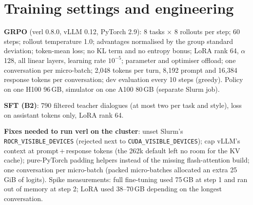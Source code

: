 \documentclass[12pt,a4paper]{article}
\begin{document}
\section{Training settings and engineering}
\label{app:eng}

\textbf{GRPO} (verl 0.8.0, vLLM 0.12, PyTorch 2.9): 8 tasks $\times$ 8
rollouts per step; 60 steps; rollout temperature 1.0; advantages normalised by
the group standard deviation; token-mean loss; no KL term and no entropy
bonus; LoRA rank 64, $\alpha$ 128, all linear layers, learning rate
$10^{-5}$; parameter and optimiser offload; one conversation per
micro-batch; 2,048 tokens per turn, 8,192 prompt and 16,384 response tokens
per conversation; dev evaluation every 10 steps (greedy). Policy on one H100
96\,GB, simulator on one A100 80\,GB (separate Slurm job).

\textbf{SFT (B2)}: 790 filtered teacher dialogues (at most two per task and
style), loss on assistant tokens only, LoRA rank 64.

\textbf{Fixes needed to run verl on the cluster}: unset Slurm's
\texttt{ROCR\_VISIBLE\_DEVICES} (rejected next to
\texttt{CUDA\_VISIBLE\_DEVICES}); cap vLLM's context at prompt\,+\,response
tokens (the 262k default left no room for the KV cache); pure-PyTorch padding
helpers instead of the missing flash-attention build; one conversation per
micro-batch (packed micro-batches allocated an extra 25\,GiB of logits).
Spike measurements: full fine-tuning used 75\,GB at step 1 and ran out of
memory at step 2; LoRA used 38--70\,GB depending on the longest conversation.
\end{document}

